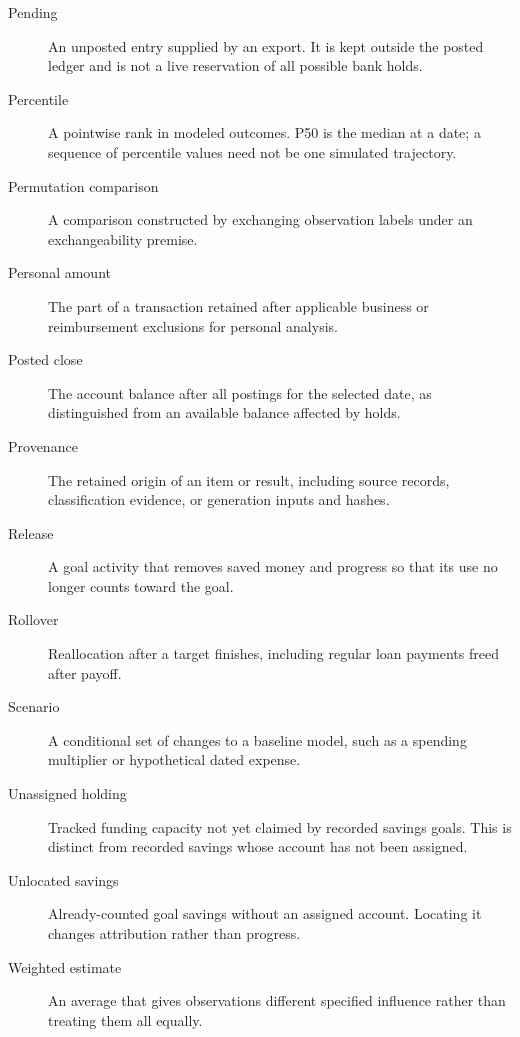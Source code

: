 \begin{description}
\item[Pending] An unposted entry supplied by an export. It is kept outside the posted ledger and is not a live reservation of all possible bank holds.
\item[Percentile] A pointwise rank in modeled outcomes. P50 is the median at a date; a sequence of percentile values need not be one simulated trajectory.
\item[Permutation comparison] A comparison constructed by exchanging observation labels under an exchangeability premise.
\item[Personal amount] The part of a transaction retained after applicable business or reimbursement exclusions for personal analysis.
\item[Posted close] The account balance after all postings for the selected date, as distinguished from an available balance affected by holds.
\item[Provenance] The retained origin of an item or result, including source records, classification evidence, or generation inputs and hashes.
\item[Release] A goal activity that removes saved money and progress so that its use no longer counts toward the goal.
\item[Rollover] Reallocation after a target finishes, including regular loan payments freed after payoff.
\item[Scenario] A conditional set of changes to a baseline model, such as a spending multiplier or hypothetical dated expense.
\item[Unassigned holding] Tracked funding capacity not yet claimed by recorded savings goals. This is distinct from recorded savings whose account has not been assigned.
\item[Unlocated savings] Already-counted goal savings without an assigned account. Locating it changes attribution rather than progress.
\item[Weighted estimate] An average that gives observations different specified influence rather than treating them all equally.
\end{description}

